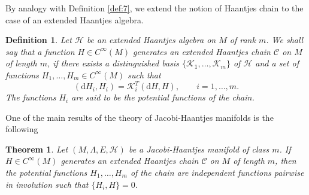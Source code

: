 \documentclass[10pt]{amsart}
\numberwithin{equation}{section}
\newcommand{\beq}{\begin{equation}}
\newcommand{\eeq}{\end{equation}}
\newcommand{\rd}{\mathrm{d}}
\newcommand{\bs}{\boldsymbol}
\newtheorem{definition}{Definition}
\newtheorem{theorem}{Theorem}
\theoremstyle{definition}
\begin{document}
By analogy with Definition \ref{def:7}, we extend the notion of Haantjes chain to the case of an extended Haantjes algebra.
\begin{definition}
Let $\mathscr{H}$ be an extended Haantjes algebra on $M$ of rank $m$. We shall say that a function $H\in C^{\infty}(M)$ generates an extended Haantjes chain $\mathscr{C}$ on $M$ of length $m$, if  there exists a distinguished basis $\{\bs{\mathcal{K}}_1,\ldots, \bs{\mathcal{K}}_m\}$ of $\mathscr{H}$ and a set of functions $H_{1},\ldots,H_{m}\in C^{\infty}(M)$ such that
 \beq \label{eqHCportuguesa}
 (\rd H_{i}, H_{i})= \bs{\mathcal{K}}_i^{T}(\rd H,H), \qquad i=1,\ldots, m.
 \eeq
The functions $H_i$ are said to be the potential functions of the chain.
\end{definition}

One of the main results of the theory of Jacobi-Haantjes manifolds is the following
\begin{theorem}
\label{themain}
Let $(M,\Lambda,E,\mathscr{H})$ be a Jacobi-Haantjes manifold of class $m$. If $H\in C^{\infty}(M)$ generates an extended Haantjes chain $\mathscr{C}$ on $M$ of length $m$,
then the potential functions $H_{1},\ldots,H_{m}$ of the chain are independent functions pairwise in involution such that $\lbrace H_{i},H\rbrace=0$. 
\end{theorem}
\end{document}
